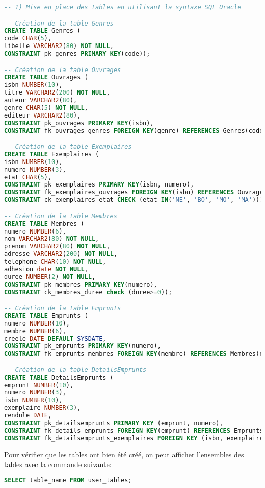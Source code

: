 \documentclass[10pt, oneside]{article}
\begin{document}
\begin{lstlisting}[language=sql, title=Question 1, label=QI1]
-- 1) Mise en place des tables en utilisant la syntaxe SQL Oracle

-- Création de la table Genres
CREATE TABLE Genres (
code CHAR(5),
libelle VARCHAR2(80) NOT NULL,
CONSTRAINT pk_genres PRIMARY KEY(code));

-- Création de la table Ouvrages
CREATE TABLE Ouvrages (
isbn NUMBER(10), 
titre VARCHAR2(200) NOT NULL,
auteur VARCHAR2(80),
genre CHAR(5) NOT NULL, 
editeur VARCHAR2(80),
CONSTRAINT pk_ouvrages PRIMARY KEY(isbn),
CONSTRAINT fk_ouvrages_genres FOREIGN KEY(genre) REFERENCES Genres(code)); 

-- Création de la table Exemplaires
CREATE TABLE Exemplaires (
isbn NUMBER(10),
numero NUMBER(3),
etat CHAR(5),
CONSTRAINT pk_exemplaires PRIMARY KEY(isbn, numero),
CONSTRAINT fk_exemplaires_ouvrages FOREIGN KEY(isbn) REFERENCES Ouvrages(isbn),
CONSTRAINT ck_exemplaires_etat CHECK (etat IN('NE', 'BO', 'MO', 'MA')));

-- Création de la table Membres
CREATE TABLE Membres (
numero NUMBER(6), 
nom VARCHAR2(80) NOT NULL,
prenom VARCHAR2(80) NOT NULL,
adresse VARCHAR2(200) NOT NULL,
telephone CHAR(10) NOT NULL,
adhesion date NOT NULL,
duree NUMBER(2) NOT NULL,
CONSTRAINT pk_membres PRIMARY KEY(numero),
CONSTRAINT ck_membres_duree check (duree>=0));

-- Création de la table Emprunts
CREATE TABLE Emprunts (
numero NUMBER(10), 
membre NUMBER(6),
creele DATE DEFAULT SYSDATE,
CONSTRAINT pk_emprunts PRIMARY KEY(numero),
CONSTRAINT fk_emprunts_membres FOREIGN KEY(membre) REFERENCES Membres(numero));

-- Création de la table DetailsEmprunts
CREATE TABLE DetailsEmprunts (
emprunt NUMBER(10), 
numero NUMBER(3),
isbn NUMBER(10),
exemplaire NUMBER(3),
rendule DATE,
CONSTRAINT pk_detailsemprunts PRIMARY KEY (emprunt, numero),
CONSTRAINT fk_details_emprunts FOREIGN KEY(emprunt) REFERENCES Emprunts(numero),
CONSTRAINT fk_detailsemprunts_exemplaires FOREIGN KEY (isbn, exemplaire) REFERENCES Exemplaires(isbn, numero));
\end{lstlisting}

Pour vérifier que les tables ont bien été créé, on peut afficher l'ensembles des tables avec la commande suivante:
\begin{lstlisting}[language=sql, numbers=none, frame=none]
SELECT table_name FROM user_tables;
\end{lstlisting}
\end{document}
